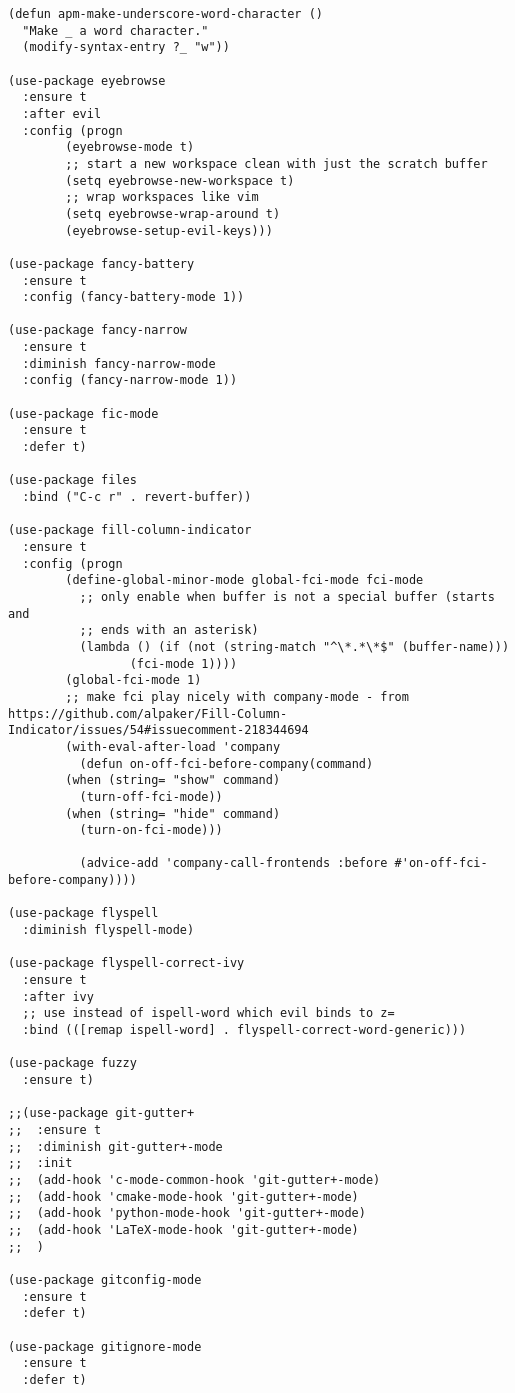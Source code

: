 \documentclass[11pt]{article}
\begin{document}
\begin{verbatim}
(defun apm-make-underscore-word-character ()
  "Make _ a word character."
  (modify-syntax-entry ?_ "w"))

(use-package eyebrowse
  :ensure t
  :after evil
  :config (progn
	    (eyebrowse-mode t)
	    ;; start a new workspace clean with just the scratch buffer
	    (setq eyebrowse-new-workspace t)
	    ;; wrap workspaces like vim
	    (setq eyebrowse-wrap-around t)
	    (eyebrowse-setup-evil-keys)))

(use-package fancy-battery
  :ensure t
  :config (fancy-battery-mode 1))

(use-package fancy-narrow
  :ensure t
  :diminish fancy-narrow-mode
  :config (fancy-narrow-mode 1))

(use-package fic-mode
  :ensure t
  :defer t)

(use-package files
  :bind ("C-c r" . revert-buffer))

(use-package fill-column-indicator
  :ensure t
  :config (progn
	    (define-global-minor-mode global-fci-mode fci-mode
	      ;; only enable when buffer is not a special buffer (starts and
	      ;; ends with an asterisk)
	      (lambda () (if (not (string-match "^\*.*\*$" (buffer-name)))
			     (fci-mode 1))))
	    (global-fci-mode 1)
	    ;; make fci play nicely with company-mode - from https://github.com/alpaker/Fill-Column-Indicator/issues/54#issuecomment-218344694
	    (with-eval-after-load 'company
	      (defun on-off-fci-before-company(command)
		(when (string= "show" command)
		  (turn-off-fci-mode))
		(when (string= "hide" command)
		  (turn-on-fci-mode)))

	      (advice-add 'company-call-frontends :before #'on-off-fci-before-company))))

(use-package flyspell
  :diminish flyspell-mode)

(use-package flyspell-correct-ivy
  :ensure t
  :after ivy
  ;; use instead of ispell-word which evil binds to z=
  :bind (([remap ispell-word] . flyspell-correct-word-generic)))

(use-package fuzzy
  :ensure t)

;;(use-package git-gutter+
;;  :ensure t
;;  :diminish git-gutter+-mode
;;  :init
;;  (add-hook 'c-mode-common-hook 'git-gutter+-mode)
;;  (add-hook 'cmake-mode-hook 'git-gutter+-mode)
;;  (add-hook 'python-mode-hook 'git-gutter+-mode)
;;  (add-hook 'LaTeX-mode-hook 'git-gutter+-mode)
;;  )

(use-package gitconfig-mode
  :ensure t
  :defer t)

(use-package gitignore-mode
  :ensure t
  :defer t)


\end{verbatim}
\end{document}
